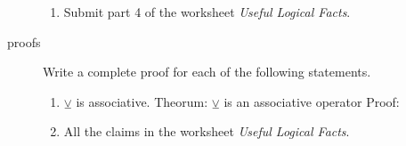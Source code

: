 \documentclass{letter}
\begin{document}
\begin{description}
\begin{enumerate}
	\item Submit part 4 of the worksheet {\em Useful Logical Facts}.
\end{enumerate}
\item[proofs] Write a complete proof for each of the following statements.
	\begin{enumerate}
		\item $\veebar$ is associative.
                  Theorum: $\veebar$ is an associative operator
                  Proof:
		\item All the claims in the worksheet {\em Useful Logical Facts}.
	\end{enumerate}
\end{description}
\end{document}
